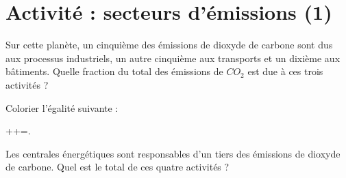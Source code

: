 
\section*{Activité : secteurs d'émissions (1)}

Sur cette planète, un cinquième des émissions de dioxyde de carbone sont dus aux processus industriels, un autre cinquième aux transports et un dixième aux bâtiments. Quelle fraction du total des émissions de \( CO_2\) est due à ces trois activités ?

Colorier l'égalité suivante :
\begin{center}
    ++=.
\end{center}

Les centrales énergétiques sont responsables d'un tiers des émissions de dioxyde de carbone. Quel est le total de ces quatre activités ?

